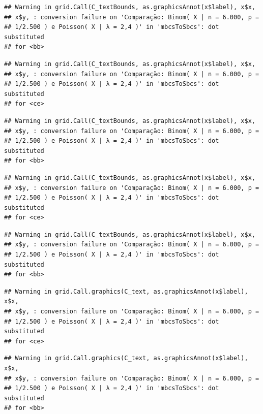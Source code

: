 \documentclass[
  11pt]{report}
\begin{document}
\begin{verbatim}
## Warning in grid.Call(C_textBounds, as.graphicsAnnot(x$label), x$x,
## x$y, : conversion failure on 'Comparação: Binom( X | n = 6.000, p =
## 1/2.500 ) e Poisson( X | λ = 2,4 )' in 'mbcsToSbcs': dot substituted
## for <bb>
\end{verbatim}

\begin{verbatim}
## Warning in grid.Call(C_textBounds, as.graphicsAnnot(x$label), x$x,
## x$y, : conversion failure on 'Comparação: Binom( X | n = 6.000, p =
## 1/2.500 ) e Poisson( X | λ = 2,4 )' in 'mbcsToSbcs': dot substituted
## for <ce>
\end{verbatim}

\begin{verbatim}
## Warning in grid.Call(C_textBounds, as.graphicsAnnot(x$label), x$x,
## x$y, : conversion failure on 'Comparação: Binom( X | n = 6.000, p =
## 1/2.500 ) e Poisson( X | λ = 2,4 )' in 'mbcsToSbcs': dot substituted
## for <bb>
\end{verbatim}

\begin{verbatim}
## Warning in grid.Call(C_textBounds, as.graphicsAnnot(x$label), x$x,
## x$y, : conversion failure on 'Comparação: Binom( X | n = 6.000, p =
## 1/2.500 ) e Poisson( X | λ = 2,4 )' in 'mbcsToSbcs': dot substituted
## for <ce>
\end{verbatim}

\begin{verbatim}
## Warning in grid.Call(C_textBounds, as.graphicsAnnot(x$label), x$x,
## x$y, : conversion failure on 'Comparação: Binom( X | n = 6.000, p =
## 1/2.500 ) e Poisson( X | λ = 2,4 )' in 'mbcsToSbcs': dot substituted
## for <bb>
\end{verbatim}

\begin{verbatim}
## Warning in grid.Call.graphics(C_text, as.graphicsAnnot(x$label), x$x,
## x$y, : conversion failure on 'Comparação: Binom( X | n = 6.000, p =
## 1/2.500 ) e Poisson( X | λ = 2,4 )' in 'mbcsToSbcs': dot substituted
## for <ce>
\end{verbatim}

\begin{verbatim}
## Warning in grid.Call.graphics(C_text, as.graphicsAnnot(x$label), x$x,
## x$y, : conversion failure on 'Comparação: Binom( X | n = 6.000, p =
## 1/2.500 ) e Poisson( X | λ = 2,4 )' in 'mbcsToSbcs': dot substituted
## for <bb>
\end{verbatim}
\end{document}
